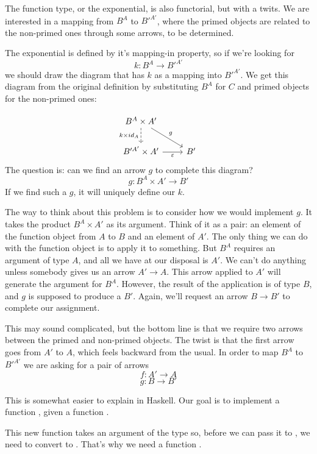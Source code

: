 \documentclass[DaoFP]{subfiles}
\begin{document}
The function type, or the exponential, is also functorial, but with a twits. We are interested in a mapping from $B^A$ to $B'^{A'}$, where the primed objects are related to the non-primed ones through some arrows, to be determined. 

The exponential is defined by it's mapping-in property, so if we're looking for
\[k \colon B^A \to B'^{A'} \]
we should draw the diagram that has $k$ as a mapping into $B'^{A'}$. We get this diagram from the original definition by substituting $B^A$ for $C$ and primed objects for the non-primed ones:

\[
 \begin{tikzcd}
 B^A \times A'
 \arrow[d, dashed, "k \times id_A"']
 \arrow[rd, "g"]
 \\
 B'^{A'} \times A'
 \arrow[r, "\varepsilon"']
& B'
 \end{tikzcd}
\]
The question is: can we find an arrow $g$ to complete this diagram? 
\[g \colon B^A \times A' \to B'\]
If we find such a $g$, it will uniquely define our $k$.

The way to think about this problem is to consider how we would implement $g$. It takes the product $B^A \times A'$ as its argument. Think of it as a pair: an element of the function object from $A$ to $B$ and an element of $A'$. The only thing we can do with the function object is to apply it to something. But $B^A$ requires an argument of type $A$, and all we have at our disposal is $A'$. We can't do anything unless somebody gives us an arrow $A' \to A$. This arrow applied to $A'$ will generate the argument for $B^A$. However, the result of the application is of type $B$, and $g$ is supposed to produce a $B'$. Again, we'll request an arrow $B \to B'$ to complete our assignment. 

This may sound complicated, but the bottom line is that we require two arrows between the primed and non-primed objects. The twist is that the first arrow goes from $A'$ to $A$, which feels backward from the usual. In order to map $B^A$ to $B'^{A'}$ we are asking for a pair of arrows
\[f \colon A' \to A\]
\[g \colon B \to B' \]

This is somewhat easier to explain in Haskell. Our goal is to implement a function , given a function . 

This new function takes an argument of the type  so, before we can pass it to , we need to convert  to . That's why we need a function . 
\end{document}
